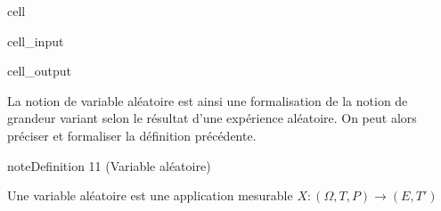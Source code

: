 \documentclass[letterpaper,10pt,french]{sphinxmanual}
\begin{document}
\begin{sphinxuseclass}{cell}
\begin{sphinxuseclass}{cell_input}
\begin{sphinxVerbatim}[commandchars=\\\{\}]
 \PYG{p}{[}\PYG{p}{]} \PYG{p}{[}\PYG{p}{]}
           
\PYG{p}{[}\PYG{p}{]} \PYG{p}{[}\PYG{p}{]} \PYG{p}{[}\PYG{p}{]} 
           
   
\end{sphinxVerbatim}

\end{sphinxuseclass}
\begin{sphinxuseclass}{cell_output}
\noindent{}

\end{sphinxuseclass}
\end{sphinxuseclass}
\sphinxAtStartPar
La notion de variable aléatoire est ainsi une formalisation de la notion de grandeur variant selon le résultat d’une expérience aléatoire. On peut alors préciser et formaliser la définition précédente.
\label{Rappels:definition-23}
\begin{sphinxadmonition}{note}{Definition 11 (Variable aléatoire)}



\sphinxAtStartPar
Une variable aléatoire est une application mesurable \(X:(\Omega,T,P) \rightarrow (E,T')\)
\end{sphinxadmonition}
\label{Rappels:remark-24}
\end{document}
